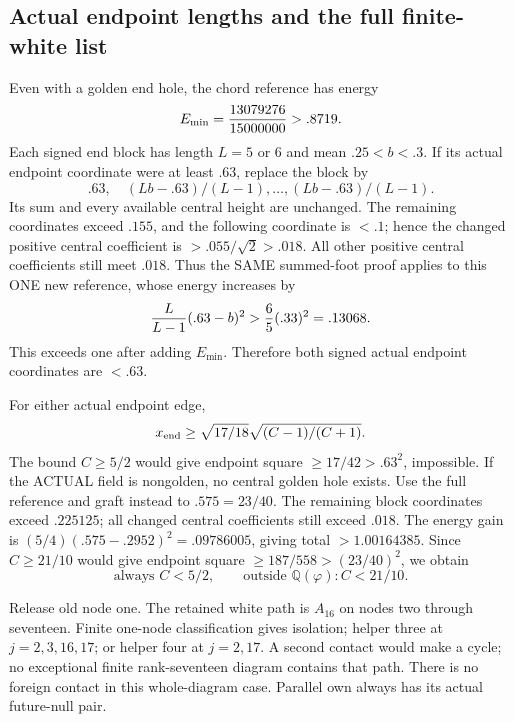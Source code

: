 \subsection{Actual endpoint lengths and the full finite-white list}
\label{app:arithA17endpointlist}

Even with a golden end hole, the chord reference has energy
\[
 E_{\min}={13079276\over15000000}>.8719 .
\]
Each signed end block has length \(L=5\) or \(6\) and mean
\(.25<b<.3\).
If its actual endpoint coordinate were at least \(.63\), replace
the block by
\[
 .63,\quad (Lb-.63)/(L-1),\ldots,(Lb-.63)/(L-1).
\]
Its sum and every available central height are unchanged.
The remaining coordinates exceed \(.155\), and the following
coordinate is \(<.1\); hence the changed positive central
coefficient is \(>.055/\sqrt2>.018\).
All other positive central coefficients still meet \(.018\).
Thus the SAME summed-foot proof applies to this ONE new
reference, whose energy increases by
\[
 {L\over L-1}(.63-b)^2>{6\over5}(.33)^2=.13068.
\]
This exceeds one after adding \(E_{\min}\).
Therefore both signed actual endpoint coordinates are \(<.63\).

For either actual endpoint edge,
\[
 x_{\rm end}\ge\sqrt{17/18}
                        \sqrt{(C-1)/(C+1)} .
\]
The bound \(C\ge5/2\) would give endpoint square
\(\ge17/42>.63^2\), impossible.
If the ACTUAL field is nongolden, no central golden hole exists.
Use the full reference and graft instead to \(.575=23/40\).
The remaining block coordinates exceed \(.225125\);
all changed central coefficients still exceed \(.018\).
The energy gain is
\((5/4)(.575-.2952)^2=.09786005\), giving total
\(>1.00164385\).
Since \(C\ge21/10\) would give endpoint square
\(\ge187/558>(23/40)^2\), we obtain
\[
 \text{always }C<5/2,\qquad
 \text{outside }\mathbb Q(\varphi): C<21/10 .
\tag{A17C}\label{eq:arithA17C}
\]

Release old node one.
The retained white path is \(A_{16}\) on nodes two through
seventeen.  Finite one-node classification gives isolation;
helper three at \(j=2,3,16,17\); or helper four at \(j=2,17\).
A second contact would make a cycle; no exceptional finite
rank-seventeen diagram contains that path.
There is no foreign contact in this whole-diagram case.
Parallel own always has its actual future-null pair.

